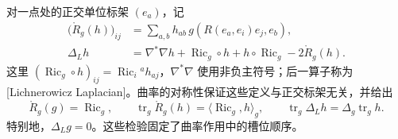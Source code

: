 对一点处的正交单位标架 \((e_a)\)，记
\begin{equation}\label{g3:eq:curvature-action-symmetric-tensors}
	\begin{aligned}
		\bigl(\mathring R_g(h)\bigr)_{ij}
		&=\sum_{a,b}h_{ab}\,g(R(e_a,e_i)e_j,e_b),\\
		\Delta_Lh&=\nabla^*\nabla h+\operatorname{Ric}_g\circ h+h\circ\operatorname{Ric}_g-2\mathring R_g(h).
	\end{aligned}
\end{equation}
这里 \((\operatorname{Ric}_g\circ h)_{ij}=\operatorname{Ric}_i{}^a h_{aj}\)，\(\nabla^*\nabla\) 使用非负主符号；后一算子称为[Lichnerowicz Laplacian]。曲率的对称性保证这些定义与正交标架无关，并给出
\[
	\mathring R_g(g)=\operatorname{Ric}_g,\qquad
	\operatorname{tr}_g\mathring R_g(h)=\langle\operatorname{Ric}_g,h\rangle_g,
	\qquad \operatorname{tr}_g\Delta_Lh=\Delta_g\operatorname{tr}_g h.
\]
特别地，\(\Delta_Lg=0\)。这些检验固定了曲率作用中的槽位顺序。

